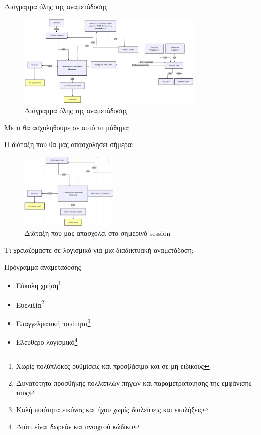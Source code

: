 \documentclass[aspectratio=169]{beamer}
\begin{document}
\begin{frame}{Διάγραμμα όλης της αναμετάδοσης}
  \begin{figure}
    \includegraphics[width=0.8\textwidth]{images/diagram.png}
    \caption{Διάγραμμα όλης της αναμετάδοσης}
    \label{fig:diagram}
  \end{figure}
  
  
\end{frame}
\begin{frame}{Με τι θα ασχοληθούμε σε αυτό το μάθημα;}
  \begin{block}{Η διάταξη που θα μας απασχολήσει σήμερα:}
    \begin{figure}
      \includegraphics[width=0.42\textwidth]{images/laptop.png}
      \caption{Διάταξη που μας απασχολεί στο σημερινό session}
      \label{fig:laptop}
    \end{figure}
  \end{block}
  \end{frame}

\begin{frame}{Τι χρειαζόμαστε σε λογισμικό για μια διαδικτυακή αναμετάδοση;}
  \begin{block}{Πρόγραμμα αναμετάδοσης}
    \begin{itemize}
      \item Εύκολη χρήση\footnote{Χωρίς πολύπλοκες ρυθμίσεις και προσβάσιμο και σε μη ειδικούς}
      \item Ευελιξία\footnote{Δυνατότητα προσθήκης πολλαπλών πηγών και παραμετροποίησης της εμφάνισης τους}
      \item Επαγγελματική ποιότητα\footnote{Καλή ποιότητα εικόνας και ήχου χωρίς διαλείψεις και εκπλήξεις}
      \item Ελεύθερο λογισμικό\footnote{Διότι είναι δωρεάν και ανοιχτού κώδικα}
    \end{itemize}
  \end{block}
\end{frame}
\end{document}

